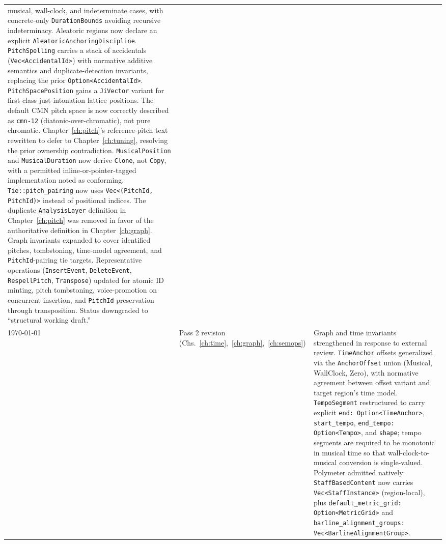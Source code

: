 \documentclass[11pt,letterpaper]{report}
\begin{document}
\begin{longtable}{p{2cm} p{2.5cm} p{9cm}}
  musical, wall-clock, and indeterminate cases, with concrete-only
  \texttt{DurationBounds} avoiding recursive indeterminacy.
  Aleatoric regions now declare an explicit
  \texttt{AleatoricAnchoringDiscipline}. \texttt{PitchSpelling}
  carries a stack of accidentals (\texttt{Vec<AccidentalId>}) with
  normative additive semantics and duplicate-detection invariants,
  replacing the prior \texttt{Option<AccidentalId>}.
  \texttt{PitchSpacePosition} gains a \texttt{JiVector} variant for
  first-class just-intonation lattice positions. The default CMN
  pitch space is now correctly described as
  \texttt{cmn-12} (diatonic-over-chromatic), not pure chromatic.
  Chapter~\ref{ch:pitch}'s reference-pitch text rewritten to defer
  to Chapter~\ref{ch:tuning}, resolving the prior ownership
  contradiction. \texttt{MusicalPosition} and \texttt{MusicalDuration}
  now derive \texttt{Clone}, not \texttt{Copy}, with a permitted
  inline-or-pointer-tagged implementation noted as conforming.
  \texttt{Tie::pitch\_pairing} now uses \texttt{Vec<(PitchId, PitchId)>}
  instead of positional indices. The duplicate \texttt{AnalysisLayer}
  definition in Chapter~\ref{ch:pitch} was removed in favor of the
  authoritative definition in Chapter~\ref{ch:graph}. Graph
  invariants expanded to cover identified pitches, tombstoning,
  time-model agreement, and \texttt{PitchId}-pairing tie targets.
  Representative operations (\texttt{InsertEvent},
  \texttt{DeleteEvent}, \texttt{RespellPitch}, \texttt{Transpose})
  updated for atomic ID minting, pitch tombstoning,
  voice-promotion on concurrent insertion, and \texttt{PitchId}
  preservation through transposition. Status downgraded to
  ``structural working draft.'' \\
  \today & Pass 2 revision (Chs.~\ref{ch:time},~\ref{ch:graph},~\ref{ch:semops}) &
  Graph and time invariants strengthened in response to external
  review. \texttt{TimeAnchor} offsets generalized via the
  \texttt{AnchorOffset} union (Musical, WallClock, Zero), with
  normative agreement between offset variant and target region's
  time model. \texttt{TempoSegment} restructured to carry explicit
  \texttt{end: Option<TimeAnchor>}, \texttt{start\_tempo},
  \texttt{end\_tempo: Option<Tempo>}, and \texttt{shape}; tempo
  segments are required to be monotonic in musical time so that
  wall-clock-to-musical conversion is single-valued. Polymeter
  admitted natively: \texttt{StaffBasedContent} now carries
  \texttt{Vec<StaffInstance>} (region-local), plus
  \texttt{default\_metric\_grid: Option<MetricGrid>} and
  \texttt{barline\_alignment\_groups: Vec<BarlineAlignmentGroup>}.

\end{longtable}
\end{document}
